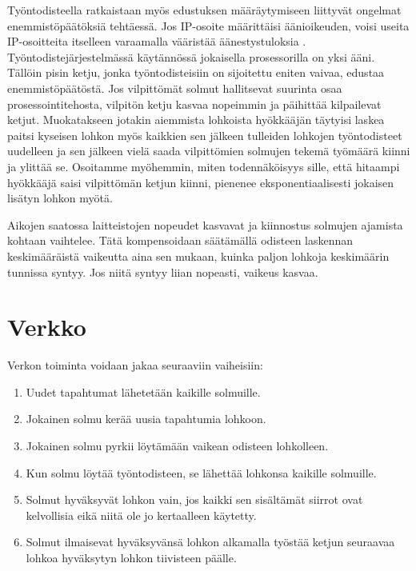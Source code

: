 \documentclass{article}
\begin{document}
Työntodisteella ratkaistaan myös edustuksen määräytymiseen liittyvät ongelmat enemmistöpäätöksiä tehtäessä. Jos IP-osoite määrittäisi äänioikeuden, voisi useita IP-osoitteita itselleen varaamalla vääristää ää\-nes\-tys\-tu\-lok\-si\-a . Työn\-to\-dis\-te\-jär\-jes\-tel\-mäs\-sä  käytännössä jokaisella prosessorilla on yksi ääni. Tällöin pisin ketju, jonka työntodisteisiin on sijoitettu eniten vaivaa, edustaa e\-nem\-mis\-tö\-pää\-tös\-tä. Jos vilpittömät solmut hallitsevat suurinta osaa prosessointitehosta, vilpitön ketju kasvaa nopeimmin ja päihittää kilpailevat ketjut. Muokatakseen jotakin aiemmista lohkoista hyökkääjän täytyisi laskea paitsi kyseisen lohkon myös kaikkien sen jälkeen tulleiden lohkojen työntodisteet uudelleen ja sen jälkeen vielä saada vilpittömien solmujen tekemä työmäärä kiinni ja ylittää se. Osoitamme myöhemmin, miten todennäköisyys sille, että hitaampi hyökkääjä saisi vilpittömän ketjun kiinni, pienenee eksponentiaalisesti jokaisen lisätyn lohkon myötä.

Aikojen saatossa laitteistojen nopeudet kasvavat ja kiinnostus solmujen ajamista kohtaan vaihtelee. Tätä kompensoidaan säätämällä odisteen laskennan keskimääräistä vaikeutta aina sen mukaan, kuinka paljon lohkoja keskimäärin tunnissa syntyy. Jos niitä syntyy liian nopeasti, vaikeus kasvaa.

\section{Verkko}

Verkon toiminta voidaan jakaa seuraaviin vaiheisiin:

\begin{enumerate}
    \item Uudet tapahtumat lähetetään kaikille solmuille.
    \item Jokainen solmu kerää uusia tapahtumia lohkoon.
    \item Jokainen solmu pyrkii löytämään vaikean odisteen lohkolleen.
    \item Kun solmu löytää työntodisteen, se lähettää lohkonsa kaikille solmuille.
    \item Solmut hyväksyvät lohkon vain, jos kaikki sen sisältämät siirrot ovat kelvollisia eikä niitä ole jo kertaalleen käytetty.
    \item Solmut ilmaisevat hyväksyvänsä lohkon alkamalla työstää ketjun seuraavaa lohkoa hyväksytyn lohkon tiivisteen päälle.
\end{enumerate}
\end{document}
